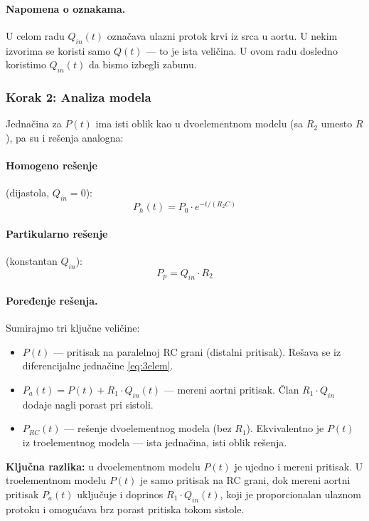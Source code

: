 \documentclass[12pt,a4paper]{article}
\begin{document}
\paragraph{Napomena o oznakama.} U celom radu $Q_{in}(t)$ označava ulazni protok krvi iz srca u aortu. U nekim izvorima se koristi samo $Q(t)$ --- to je ista veličina. U ovom radu dosledno koristimo $Q_{in}(t)$ da bismo izbegli zabunu.

\subsubsection{Korak 2: Analiza modela}

Jednačina za $P(t)$ ima isti oblik kao u dvoelementnom modelu (sa $R_2$ umesto $R$), pa su i rešenja analogna:

\paragraph{Homogeno rešenje} (dijastola, $Q_{in} = 0$):
\begin{equation}
    P_h(t) = P_0\cdot e^{-t/(R_2 C)}
\end{equation}

\paragraph{Partikularno rešenje} (konstantan $Q_{in}$):
\begin{equation}
    P_p = Q_{in}\cdot R_2
\end{equation}

\paragraph{Poređenje rešenja.} Sumirajmo tri ključne veličine:
\begin{itemize}
    \item $P(t)$ --- pritisak na paralelnoj RC grani (distalni pritisak). Rešava se iz diferencijalne jednačine \eqref{eq:3elem}.
    \item $P_a(t) = P(t) + R_1\cdot Q_{in}(t)$ --- mereni aortni pritisak. Član $R_1\cdot Q_{in}$ dodaje nagli porast pri sistoli.
    \item $P_{RC}(t)$ --- rešenje dvoelementnog modela (bez $R_1$). Ekvivalentno je $P(t)$ iz troelementnog modela --- ista jednačina, isti oblik rešenja.
\end{itemize}

\textbf{Ključna razlika:} u dvoelementnom modelu $P(t)$ je ujedno i mereni pritisak. U troelementnom modelu $P(t)$ je samo pritisak na RC grani, dok mereni aortni pritisak $P_a(t)$ uključuje i doprinos $R_1\cdot Q_{in}(t)$, koji je proporcionalan ulaznom protoku i omogućava brz porast pritiska tokom sistole.
\end{document}
